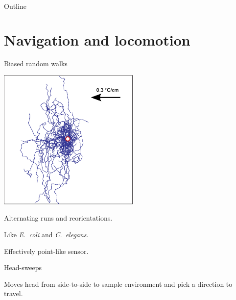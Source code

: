 \documentclass{beamer}%
\newcommand{\Hs}{Head-sweep}
\begin{document}

\begin{frame}{Outline}
%
 \tableofcontents[hideallsubsections]
%
\end{frame}


\section{Navigation and locomotion}



\begin{frame}{Biased random walks}
%
 \parbox{5cm}{   \includegraphics[width=7cm]{Figs/CSandMHCGFPcenteredtracks2.eps} }
 \parbox{6cm}{Alternating runs and reorientations.

 \vp Like \emph{E.\ coli} and \emph{C.\ elegans}.

 \vp Effectively point-like sensor.}
%
\end{frame}


\begin{frame}{\Hs s}
%
 \begin{center}
 \end{center}
 Moves head from side-to-side to sample environment and pick a direction to travel.
%
\end{frame}

\end{document}
